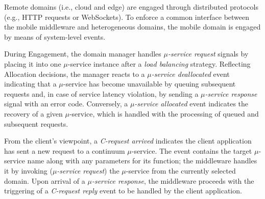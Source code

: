 Remote domains (i.e., cloud and edge) are engaged through distributed protocols (e.g., HTTP requests or WebSockets). To enforce a common interface between the mobile middleware and heterogeneous domains, the mobile domain is engaged by means of system-level events.

During Engagement, the domain manager handles \textit{$\mu$-service request} signals by placing it into one $\mu$-service instance after a \textit{load balancing} strategy. Reflecting Allocation decisions, the manager reacts to a \textit{$\mu$-service deallocated} event 
indicating that a $\mu$-service has become unavailable 
by queuing subsequent requests and, in case of service latency violation, by sending a \textit{$\mu$-service response} signal with an error code. Conversely, a \textit{$\mu$-service allocated} event indicates the recovery of a given $\mu$-service, which is handled with the processing of queued and subsequent requests. 


%
%		
%		
%		

From the client's viewpoint, a \textit{C-request arrived} indicates the client application has sent a new request to a continuum $\mu$-service. The event contains the target $\mu$-service name along with any parameters for its function; the middleware handles it by invoking (\textit{$\mu$-service request}) the $\mu$-service from the currently selected domain. Upon arrival of a \textit{$\mu$-service response}, the middleware proceeds with the triggering of a \textit{C-request reply} event to be handled by the client application.  

